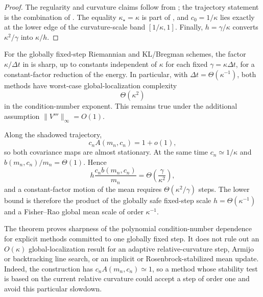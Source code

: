 \begin{proof}
The regularity and curvature claims follow from
; the trajectory statement is the combination of
.  The equality
$\kappa_\star=\kappa$ is part of , and
$c_0=1/\kappa$ lies exactly at the lower edge of the curvature-scale band
$[1/\kappa,1]$.  Finally, $h=\gamma/\kappa$ converts
$\kappa^2/\gamma$ into $\kappa/h$.
\end{proof}

\begin{corollary}
\label{cor:disc-global-sharp}
For the globally fixed-step Riemannian and KL/Bregman schemes, the factor
$\kappa/\Delta t$ in  is sharp, up to constants
independent of $\kappa$ for each fixed $\gamma=\kappa\Delta t$, for a constant-factor
reduction of the energy.  In particular, with
$\Delta t=\Theta(\kappa^{-1})$, both methods have worst-case global-localization complexity
\[
    \Theta(\kappa^2)
\]
in the condition-number exponent.  This remains true under the additional assumption
$\|V'''\|_\infty=O(1)$.
\end{corollary}

\begin{remark}
Along the shadowed trajectory,
\[
    c_nA(m_n,c_n)=1+o(1),
\]
so both covariance maps are almost stationary.  At the same time $c_n\simeq1/\kappa$ and
$b(m_n,c_n)/m_n=\Theta(1)$.  Hence
\[
    h\frac{c_nb(m_n,c_n)}{m_n}
    =\Theta\left(\frac{\gamma}{\kappa^2}\right),
\]
and a constant-factor motion of the mean requires $\Theta(\kappa^2/\gamma)$ steps.  The
lower bound is therefore the product of the globally safe fixed-step scale
$h=\Theta(\kappa^{-1})$ and a Fisher--Rao global mean scale of order $\kappa^{-1}$.
\end{remark}

\begin{remark}
The theorem proves sharpness of the polynomial condition-number dependence for explicit methods
committed to one globally fixed step.  It does not rule out an $O(\kappa)$ global-localization
result for an adaptive relative-curvature step, Armijo or backtracking line search, or an implicit
or Rosenbrock-stabilized mean update.  Indeed, the construction has
$c_nA(m_n,c_n)\simeq1$, so a method whose stability test is based on the current relative
curvature could accept a step of order one and avoid this particular slowdown.
\end{remark}


